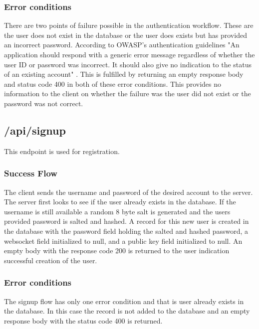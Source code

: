 \subsubsection{Error conditions}


There are two points of failure possible in the authentication workflow. These are the user does not exist in the database or the user does exists but has provided an incorrect password. According to OWASP's authentication guidelines "An application should respond with a generic error message regardless of whether the user ID or password was incorrect. It should also give no indication to the status of an existing account" \cite{owasp-auth}. This is fulfilled by returning an empty response body and status code 400 in both of these error conditions. This provides no information to the client on whether the failure was the user did not exist or the password was not correct. 


\subsection{/api/signup}


This endpoint is used for registration.


\subsubsection{Success Flow}


The client sends the username and password of the desired account to the server. The server first looks to see if the user already exists in the database. If the username is still available a random 8 byte salt is generated and the users provided password is salted and hashed. A record for this new user is created in the database with the password field holding the salted and hashed password, a websocket field initialized to null, and a public key field initialized to null. An empty body with the response code 200 is returned to the user indication successful creation of the user.


\subsubsection{Error conditions}


The signup flow has only one error condition and that is user already exists in the database. In this case the record is not added to the database and an empty response body with the status code 400 is returned.


